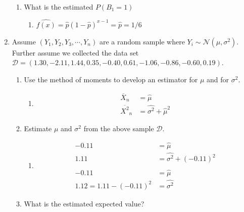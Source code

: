 \documentclass[krantz1,ChapterTOCs]{krantz}
\begin{document}
\begin{enumerate}
\begin{enumerate}
        \item What is the estimated $P(B_{1} = 1)$
        \begin{enumerate}
            \item { \color{red} $ \hat{f(x)} = \hat{p} (1-\hat{p})^{x-1} = \hat{p} = 1/6$  }
        \end{enumerate}
        
    \end{enumerate}
    \item Assume $(Y_{1}, Y_{2},Y_{3}, \cdots, Y_{n})$ are a random sample where $Y_{i} \sim \mathcal{N}(\mu,\sigma^{2})$. Further assume we collected the data set $\mathcal{D} = (1.30, -2.11, 1.44, 0.35, -0.40, 0.61,-1.06, -0.86, -0.60, 0.19)$.
    \begin{enumerate}
        \item Use the method of moments to develop an estimator for $\mu$ and for $\sigma^{2}$.
        \begin{enumerate}
            \item {\color{red}
                \begin{align}
                     \overline{X}_{n}    &= \hat{\mu} \\ 
                    \overline{X^{2}}_{n} &= \hat{\sigma^{2}} + \hat{\mu}^{2} 
                \end{align}
            }
        \end{enumerate}
        
        \item Estimate $\mu$ and $\sigma^{2}$ from the above sample $\mathcal{D}$. 
        \begin{enumerate}
            \item {\color{red}
                \begin{align}
                    -0.11 &= \hat{\mu} \\ 
                    1.11  &= \hat{\sigma^{2}} + (-0.11)^{2} \\ 
                    \\ 
                    -0.11 &= \hat{\mu} \\ 
                    1.12 = 1.11 - (-0.11)^{2}  &= \hat{\sigma^{2}} 
                \end{align}
            }
        \end{enumerate}
        
        
        \item What is the estimated expected value? 
        \begin{enumerate}
            \item {\color{red} $\hat{\mathbb{E}(X)} = \hat{\mu} = -0.11$ 
        \end{enumerate}
        

\end{enumerate}
\end{enumerate}
\end{document}
